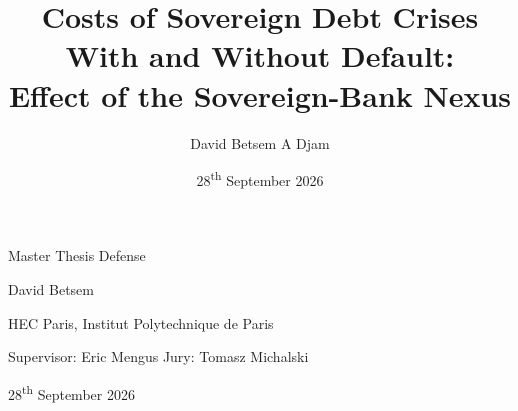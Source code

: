 \documentclass[aspectratio=169]{beamer}
\title{\large Costs of Sovereign Debt Crises With and Without Default:\\
Effect of the Sovereign-Bank Nexus}
\author{\normalsize David Betsem A Djam}
\institute{%
  \footnotesize
  HEC Paris, Institut Polytechnique de Paris
}
\date{\normalsize 28\textsuperscript{th} September 2026}
\begin{document}
{
\begin{frame}[plain]
  \vspace{0.9cm}
  \vfill
  \begin{center}
    \footnotesize {Master Thesis Defense}\par
  \end{center}
  \vspace{-0.5cm}
  \begin{center}
  \end{center}

  \begin{center}
     \normalsize David Betsem\par
  \end{center}
  \begin{center}
    \small HEC Paris, Institut Polytechnique de Paris\par
  \end{center}
  \vspace{0.05em}
  \begin{center}
     \small  Supervisor: Eric Mengus \qquad Jury: Tomasz Michalski\par
  \end{center}
  \vspace{0.9em}
  \begin{center}
    \small 28\textsuperscript{th} September 2026\par
  \end{center}
  \vspace{1.2cm}
  \vfill
\end{frame}
}
\end{document}
